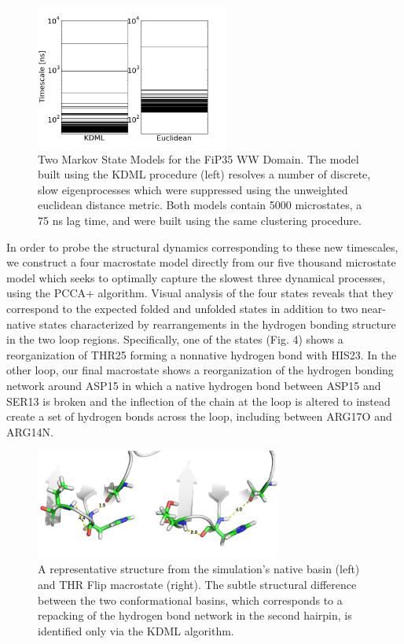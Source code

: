 \documentclass[twocolumn,floatfix,nofootinbib,aps]{revtex4-1}
\begin{document}
\begin{figure}
\centering
\includegraphics[width=2.5in]{../public/figures/bars.png}

\caption{Two Markov State Models for the FiP35 WW Domain. The model built using the KDML procedure (left) resolves a number of discrete, slow eigenprocesses which were suppressed using the unweighted euclidean distance metric. Both models contain 5000 microstates, a 75 ns lag time, and were built using the same clustering procedure.\cite{Beauchamp:2011he}}
\end{figure}

In order to probe the structural dynamics corresponding to these new timescales, we construct a four macrostate model directly from our five thousand microstate model which seeks to optimally capture the slowest three dynamical processes, using the PCCA+ algorithm.\cite{Deuflhard:2005cp} Visual analysis of the four states reveals that they correspond to the expected folded and unfolded states in addition to two near-native states characterized by rearrangements in the hydrogen bonding structure in the two loop regions. Specifically, one of the states (Fig. 4) shows a reorganization of THR25 forming a nonnative hydrogen bond with HIS23. In the other loop, our final macrostate shows a reorganization of the hydrogen bonding network around ASP15 in which a native hydrogen bond between ASP15 and SER13 is broken and the inflection of the chain at the loop is altered to instead create a set of hydrogen bonds across the loop, including between ARG17O and ARG14N. 

\begin{figure}
\vspace{1em}
\includegraphics[width=3.2in]{../public/figures/state12.png}
\caption{A representative structure from the simulation's native basin (left) and THR Flip macrostate (right). The subtle structural difference between the two conformational basins, which corresponds to a repacking of the hydrogen bond network in the second hairpin, is identified only via the KDML algorithm.}
\end{figure}
\end{document}
